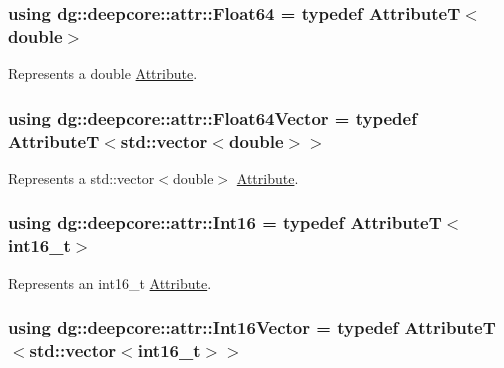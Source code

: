 \subsubsection[{\texorpdfstring{Float64}{Float64}}]{\setlength{\rightskip}{0pt plus 5cm}using {\bf dg\+::deepcore\+::attr\+::\+Float64} = typedef AttributeT$<$double$>$}\hypertarget{group___process_attributes_ga9d504bf1e2018cf5e97d3cca2a08aad9}{}\label{group___process_attributes_ga9d504bf1e2018cf5e97d3cca2a08aad9}


Represents a {\ttfamily double} \hyperlink{classdg_1_1deepcore_1_1_attribute}{Attribute}. 

\subsubsection[{\texorpdfstring{Float64\+Vector}{Float64Vector}}]{\setlength{\rightskip}{0pt plus 5cm}using {\bf dg\+::deepcore\+::attr\+::\+Float64\+Vector} = typedef AttributeT$<$std\+::vector$<$double$>$$>$}\hypertarget{group___process_attributes_ga3b16885b09409d3555584c47d6fc4964}{}\label{group___process_attributes_ga3b16885b09409d3555584c47d6fc4964}


Represents a {\ttfamily std\+::vector$<$double$>$} \hyperlink{classdg_1_1deepcore_1_1_attribute}{Attribute}. 

\subsubsection[{\texorpdfstring{Int16}{Int16}}]{\setlength{\rightskip}{0pt plus 5cm}using {\bf dg\+::deepcore\+::attr\+::\+Int16} = typedef AttributeT$<$int16\+\_\+t$>$}\hypertarget{group___process_attributes_gac2aeb0ab4afb8e7b231b95d178940f57}{}\label{group___process_attributes_gac2aeb0ab4afb8e7b231b95d178940f57}


Represents an {\ttfamily int16\+\_\+t} \hyperlink{classdg_1_1deepcore_1_1_attribute}{Attribute}. 

\subsubsection[{\texorpdfstring{Int16\+Vector}{Int16Vector}}]{\setlength{\rightskip}{0pt plus 5cm}using {\bf dg\+::deepcore\+::attr\+::\+Int16\+Vector} = typedef AttributeT$<$std\+::vector$<$int16\+\_\+t$>$$>$}\hypertarget{group___process_attributes_gabdf1a5d0966e5a203c560c36b4e70754}{}\label{group___process_attributes_gabdf1a5d0966e5a203c560c36b4e70754}


